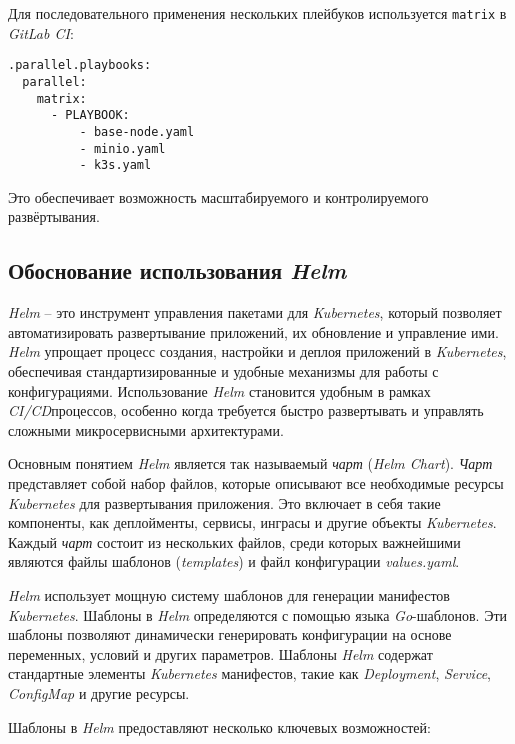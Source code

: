 Для последовательного применения нескольких плейбуков используется \lstinline{matrix} в \textit{GitLab CI}:

\begin{lstlisting}
.parallel.playbooks:
  parallel:
    matrix:
      - PLAYBOOK:
          - base-node.yaml
          - minio.yaml
          - k3s.yaml
\end{lstlisting}

Это обеспечивает возможность масштабируемого и контролируемого развёртывания.


\subsection{Обоснование использования \textit{Helm}}

\textit{Helm} -- это инструмент управления пакетами для \textit{Kubernetes}, который позволяет автоматизировать развертывание приложений, их обновление и управление ими. \textit{Helm} упрощает процесс создания, настройки и деплоя приложений в \textit{Kubernetes}, обеспечивая стандартизированные и удобные механизмы для работы с конфигурациями. Использование \textit{Helm} становится удобным в рамках \textit{CI/CD}процессов, особенно когда требуется быстро развертывать и управлять сложными микросервисными архитектурами.

Основным понятием \textit{Helm} является так называемый \textit{чарт} (\textit{Helm Chart}). \textit{Чарт} представляет собой набор файлов, которые описывают все необходимые ресурсы \textit{Kubernetes} для развертывания приложения. Это включает в себя такие компоненты, как деплойменты, сервисы, инграсы и другие объекты \textit{Kubernetes}. Каждый \textit{чарт} состоит из нескольких файлов, среди которых важнейшими являются файлы шаблонов (\textit{templates}) и файл конфигурации \textit{values.yaml}.

\textit{Helm} использует мощную систему шаблонов для генерации манифестов \textit{Kubernetes}. Шаблоны в \textit{Helm} определяются с помощью языка \textit{Go}-шаблонов. Эти шаблоны позволяют динамически генерировать конфигурации на основе переменных, условий и других параметров. Шаблоны \textit{Helm} содержат стандартные элементы \textit{Kubernetes} манифестов, такие как \textit{Deployment}, \textit{Service}, \textit{ConfigMap} и другие ресурсы. 

Шаблоны в \textit{Helm} предоставляют несколько ключевых возможностей:

